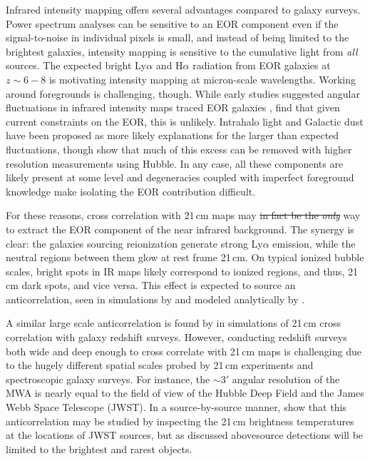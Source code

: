 \documentclass[numberedappendix]{emulateapj}
\providecommand{\DIFadd}[1]{{\protect\color{blue}\uwave{#1}}} %
\providecommand{\DIFdel}[1]{{\protect\color{red}\sout{#1}}}                      %
\providecommand{\DIFaddbegin}{} %
\providecommand{\DIFaddend}{} %
\providecommand{\DIFdelbegin}{} %
\providecommand{\DIFdelend}{} %
\begin{document}
Infrared intensity mapping offers several advantages compared to galaxy surveys. Power spectrum analyses can be sensitive to an EOR component even if the signal-to-noise in individual pixels is small, and instead of being limited to the brightest galaxies, intensity mapping is sensitive to the cumulative light from \textit{all} sources. The expected bright Ly$\alpha$ \citep[e.g.][]{primevaltwins} and H$\alpha$ \citep[e.g.][]{brightemissionlines} radiation from EOR galaxies at $z\sim6-8$ is motivating intensity mapping at micron-scale wavelengths. Working around foregrounds is challenging, though. While early studies suggested angular fluctuations in infrared intensity maps traced EOR galaxies \citep[e.g.,][]{kash1,kash2,kash3}, \citet{kash4} find that given current constraints on the EOR, this is unlikely. Intrahalo light \DIFdelbegin %
\DIFdelend \DIFaddbegin \citep{cooray12,zemcov14} \DIFaddend and Galactic dust \DIFdelbegin %
\DIFdelend \DIFaddbegin \citep{yue16} \DIFaddend have been proposed as more likely explanations for the larger than expected fluctuations, though \citet{mw15} show that much of this excess can be removed with higher resolution measurements using Hubble. In any case, all these components are likely present at some level and degeneracies coupled with imperfect foreground knowledge make isolating the EOR contribution difficult.

For these reasons, cross correlation with 21\,cm maps may \DIFdelbegin \DIFdel{in fact be the \textit{only} }\DIFdelend \DIFaddbegin \DIFadd{be the cleanest }\DIFaddend way to extract the EOR component of the near infrared background. The synergy is clear: the galaxies sourcing reionization generate strong Ly$\alpha$ emission, while the neutral regions between them glow at rest frame 21\,cm. On typical ionized bubble scales, bright spots in IR maps likely correspond to ionized regions, and thus, 21\,cm dark spots, and vice versa. This effect is expected to source an anticorrelation, seen in simulations by \citet{silva12,Heneka2016} and modeled analytically by \citet{feng17,mao14}.

A similar large scale anticorrelation is found by \citet{lidz09,park14} in simulations of 21\,cm cross correlation with galaxy redshift surveys. However, conducting redshift surveys both wide and deep enough to cross correlate with 21\,cm maps is challenging due to the hugely different spatial scales probed by 21\,cm experiments and spectroscopic galaxy surveys. For instance, the $\sim3'$ angular resolution of the MWA is nearly equal to the field of view of the Hubble Deep Field and the James Webb Space Telescope (JWST). In a source-by-source manner, \citep{beardsley15} show that this anticorrelation may be studied by inspecting the 21\,cm brightness temperatures at the locations of JWST sources, but as discussed above\DIFaddbegin \DIFadd{, }\DIFaddend source detections will be limited to the brightest and rarest objects.
\end{document}
